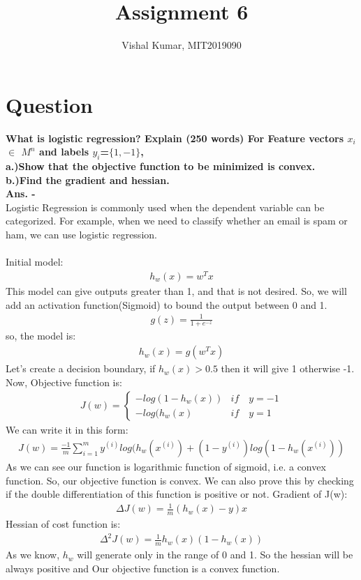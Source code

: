 \documentclass[fleqn]{article}
\title{Assignment 6}
\author{Vishal Kumar, MIT2019090}
\date{}
\begin{document}
\maketitle
\section*{Question}
{\bf What is logistic regression? Explain (250 words)
For Feature vectors $x_{i}$ $\in$ $M^{n}$ and labels $y_{i}$=$\{1,-1\}$,}
\\
{\bf a.)Show that the objective function to be minimized is convex.}
\\
{\bf b.)Find the gradient and hessian.}
\\
{\bf Ans. -}
\\
 Logistic Regression is commonly used when the dependent variable can be categorized. For example, when we need to classify whether an email is spam or ham, we can use logistic regression.
 \\
 \\
 Initial model:
\begin{align*}
h_{w}(x) = w^{T}x
\end{align*}
This model can give outputs greater than 1, and that is not desired. So, we will add an activation function(Sigmoid) to bound the output between 0 and 1.
\begin{align*}
    g(z) = \frac{1}{1 + e^{-z}}
\end{align*}
so, the model is:
\begin{align*}
h_{w}(x) = g(w^{T}x)
\end{align*}
Let's create a decision boundary, if $h_{w}(x)>0.5$ then it will give 1 otherwise -1.
\\
Now, Objective function is:
\begin{align*}
J(w) = \begin{cases}-log(1-h_{w}(x)) & if\quad y = -1\\ -log(h_{w}(x) & if\quad y = 1
\end{cases}
\end{align*}
We can write it in this form:
\begin{align*}
J(w) = \frac{-1}{m}\sum_{i=1}^m y^{(i)}log(h_{w}(x^{(i)}) + (1-y^{(i)})log(1-h_{w}(x^{(i)}))
\end{align*}
As we can see our function is logarithmic function of sigmoid, i.e. a convex function. So, our objective function is convex. We can also prove this by checking if the double differentiation of this function is positive or not.
\newpage
Gradient of J(w):
\begin{align*}
\Delta J(w) = \frac{1}{m}(h_{w}(x) - y)x
\end{align*}
Hessian of cost function is:
\begin{align*}
\Delta^{2} J(w) = \frac{1}{m}h_{w}(x)(1-h_{w}(x))
\end{align*}
As we know, $h_{w}$ will generate only in the range of 0 and 1. So the hessian will be always positive and Our objective function is a convex function. 
\end{document}
